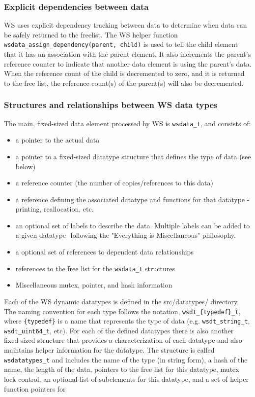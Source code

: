\documentclass[11pt]{article}
\begin{document}
\subsubsection{Explicit dependencies between data}
WS uses explicit dependency tracking between data to determine when 
data can be safely returned to the freelist.  The WS helper function
\texttt{wsdata\_assign\_dependency(parent, child)} is used to tell the 
child element that it has an association with the parent element.  It 
also increments the parent’s reference counter to indicate that 
another data element is using the parent’s data.  When the reference 
count of the child is decremented to zero, and it is returned to the 
free list, the reference count(s) of the parent(s) will also be 
decremented. 


\subsubsection{Structures and relationships between WS data types}
The main, fixed-sized data element processed by WS is
\texttt{wsdata\_t}, and consists of:

\begin{itemize}
    \item a pointer to the actual data 
    \item a pointer to a fixed-sized datatype structure that defines the type
          of data (see below)
    \item a reference counter (the number of copies/references to this data)
    \item a reference defining the associated datatype and functions for that
          datatype - printing, reallocation, etc.
    \item an optional set of labels to describe the data. Multiple labels can
          be added to a given datatype- following the "Everything is
          Miscellaneous" philosophy.
    \item a optional set of references to dependent data relationships 
    \item references to the free list for the \texttt{wsdata\_t} structures 
    \item Miscellaneous mutex, pointer, and hash information
\end{itemize}

Each of the WS dynamic datatypes is defined in the src/datatypes/ directory. 
The naming convention for each type follows the notation, 
\texttt{wsdt\_\{typedef\}\_t}, where \texttt{\{typedef\}} is a name that 
represents the type of data (e.g. \texttt{wsdt\_string\_t}, 
\texttt{wsdt\_uint64\_t}, etc). For each of the defined datatypes there is also
another fixed-sized structure that provides a 
characterization of each datatype and also maintains helper information for the
datatype. The structure is called \texttt{wsdatatypes\_t} and includes the name
of the type (in string  form), a hash of the name, the length of the data, 
pointers to the free list  for this datatype, mutex lock control, an optional 
list of subelements for this datatype, and a set of helper function pointers 
for 
\end{document}
